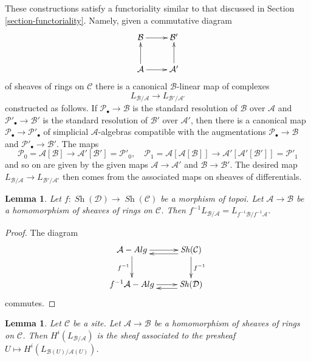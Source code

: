 \documentclass{stacks-project}
\theoremstyle{plain}
\newtheorem{lemma}[subsection]{Lemma}
\theoremstyle{definition}
\theoremstyle{remark}
\numberwithin{equation}{subsection}
\def\Sh{\mathop{\mathit{Sh}}\nolimits}
\begin{document}
\noindent
These constructions satisfy a functoriality similar to that discussed
in Section \ref{section-functoriality}. Namely, given a commutative diagram
\begin{equation}
\label{equation-commutative-square-sheaves}
\vcenter{
\xymatrix{
\mathcal{B} \ar[r] & \mathcal{B}' \\
\mathcal{A} \ar[u] \ar[r] & \mathcal{A}' \ar[u]
}
}
\end{equation}
of sheaves of rings on $\mathcal{C}$ there is a canonical
$\mathcal{B}$-linear map of complexes
$$
L_{\mathcal{B}/\mathcal{A}} \longrightarrow L_{\mathcal{B}'/\mathcal{A}'}
$$
constructed as follows. If $\mathcal{P}_\bullet \to \mathcal{B}$ is the
standard resolution of $\mathcal{B}$ over $\mathcal{A}$ and
$\mathcal{P}'_\bullet \to \mathcal{B}'$ is the
standard resolution of $\mathcal{B}'$ over $\mathcal{A}'$,
then there is a canonical map $\mathcal{P}_\bullet \to \mathcal{P}'_\bullet$
of simplicial $\mathcal{A}$-algebras compatible with the augmentations
$\mathcal{P}_\bullet \to \mathcal{B}$ and
$\mathcal{P}'_\bullet \to \mathcal{B}'$. The maps
$$
\mathcal{P}_0 = \mathcal{A}[\mathcal{B}]
\longrightarrow
\mathcal{A}'[\mathcal{B}'] = \mathcal{P}'_0,
\quad
\mathcal{P}_1 = \mathcal{A}[\mathcal{A}[\mathcal{B}]]
\longrightarrow
\mathcal{A}'[\mathcal{A}'[\mathcal{B}']] = \mathcal{P}'_1
$$
and so on are given by the given maps $\mathcal{A} \to \mathcal{A}'$
and $\mathcal{B} \to \mathcal{B}'$. The desired map
$L_{\mathcal{B}/\mathcal{A}} \to L_{\mathcal{B}'/\mathcal{A}'}$
then comes from the associated maps on sheaves of differentials.

\begin{lemma}
\label{lemma-pullback-cotangent-morphism-topoi}
Let $f : \Sh(\mathcal{D}) \to \Sh(\mathcal{C})$ be a morphism of topoi.
Let $\mathcal{A} \to \mathcal{B}$ be a homomorphism of sheaves of rings
on $\mathcal{C}$. Then
$f^{-1}L_{\mathcal{B}/\mathcal{A}} = L_{f^{-1}\mathcal{B}/f^{-1}\mathcal{A}}$.
\end{lemma}

\begin{proof}
The diagram
$$
\xymatrix{
\mathcal{A}\textit{-Alg} \ar[d]_{f^{-1}} \ar[r] &
\Sh(\mathcal{C}) \ar@<1ex>[l] \ar[d]^{f^{-1}} \\
f^{-1}\mathcal{A}\textit{-Alg} \ar[r] & \Sh(\mathcal{D}) \ar@<1ex>[l]
}
$$
commutes.
\end{proof}

\begin{lemma}
\label{lemma-compute-L-morphism-sheaves-rings}
Let $\mathcal{C}$ be a site. Let $\mathcal{A} \to \mathcal{B}$ be a
homomorphism of sheaves of rings on $\mathcal{C}$. Then
$H^i(L_{\mathcal{B}/\mathcal{A}})$ is the sheaf associated to the
presheaf $U \mapsto H^i(L_{\mathcal{B}(U)/\mathcal{A}(U)})$.
\end{lemma}
\end{document}
